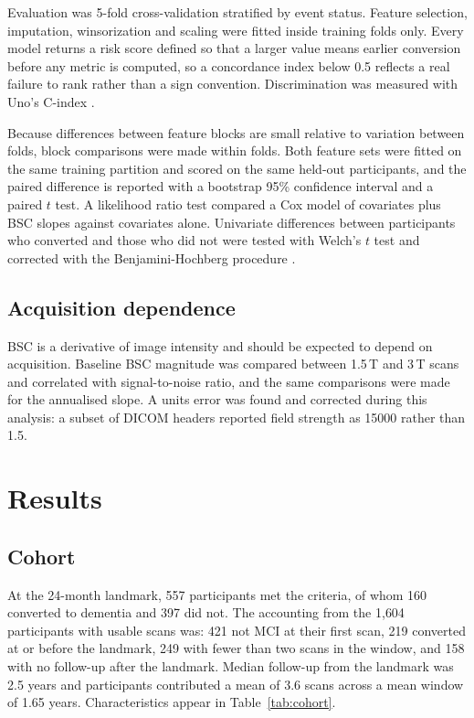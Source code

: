 \documentclass[blue]{ludusofficial}
\begin{document}
Evaluation was 5-fold cross-validation stratified by event status. Feature selection, imputation, winsorization and scaling were fitted inside training folds only. Every model returns a risk score defined so that a larger value means earlier conversion before any metric is computed, so a concordance index below 0.5 reflects a real failure to rank rather than a sign convention. Discrimination was measured with Uno's C-index \cite{uno2011cstat}.

Because differences between feature blocks are small relative to variation between folds, block comparisons were made within folds. Both feature sets were fitted on the same training partition and scored on the same held-out participants, and the paired difference is reported with a bootstrap 95\% confidence interval and a paired $t$ test. A likelihood ratio test compared a Cox model of covariates plus BSC slopes against covariates alone. Univariate differences between participants who converted and those who did not were tested with Welch's $t$ test and corrected with the Benjamini-Hochberg procedure \cite{benjamini1995controlling}.

\subsection{Acquisition dependence}

BSC is a derivative of image intensity and should be expected to depend on acquisition. Baseline BSC magnitude was compared between 1.5\,T and 3\,T scans and correlated with signal-to-noise ratio, and the same comparisons were made for the annualised slope. A units error was found and corrected during this analysis: a subset of DICOM headers reported field strength as 15000 rather than 1.5.

\section{Results}

\subsection{Cohort}

At the 24-month landmark, 557 participants met the criteria, of whom 160 converted to dementia and 397 did not. The accounting from the 1{,}604 participants with usable scans was: 421 not MCI at their first scan, 219 converted at or before the landmark, 249 with fewer than two scans in the window, and 158 with no follow-up after the landmark. Median follow-up from the landmark was 2.5 years and participants contributed a mean of 3.6 scans across a mean window of 1.65 years. Characteristics appear in Table~\ref{tab:cohort}.
\end{document}
